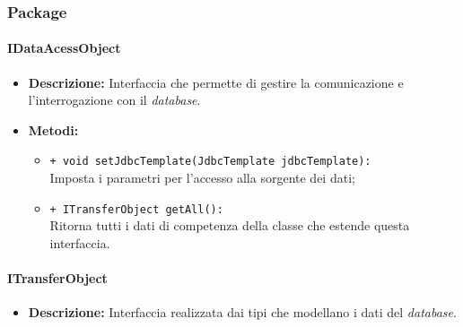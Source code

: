 \subsubsection{Package \model{}}

\paragraph{IDataAcessObject}
\label{idataacessobject}
\begin{flushleft}
\begin{itemize}
\item \textbf{Descrizione:} Interfaccia che permette di gestire la comunicazione e l'interrogazione con il \textit{database}.
\item \textbf{Metodi:}
\begin{sloppypar}
\begin{itemize}
\item \texttt{+ void setJdbcTemplate(JdbcTemplate jdbcTemplate):}\\ Imposta i parametri per l'accesso alla sorgente dei dati;
\item \texttt{+ ITransferObject getAll():}\\ Ritorna tutti i dati di competenza della classe che estende questa interfaccia.
\end{itemize}
\end{sloppypar}
\end{itemize}
\end{flushleft}

\paragraph{ITransferObject}
\label{itransferobject}
\begin{flushleft}
\begin{itemize}
\item \textbf{Descrizione:} Interfaccia realizzata dai tipi che modellano i dati del \textit{database}.
\end{itemize}
\end{flushleft}

